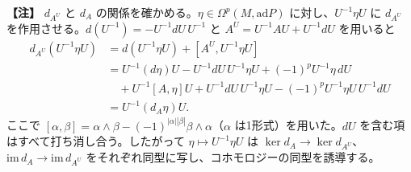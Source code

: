 \documentclass[uplatex, dvipdfmx, book]{jsbook}
\newenvironment{note}{\vspace{1ex}\par\footnotesize\noindent\textbf{【注】}}{\par\vspace{1ex}}
\begin{document}
\begin{note}
$d_{A^U}$ と $d_A$ の関係を確かめる。$\eta \in \Omega^p(M, \mathrm{ad}P)$ に対し、$U^{-1}\eta U$ に $d_{A^U}$ を作用させる。$d(U^{-1}) = -U^{-1}dU\,U^{-1}$ と $A^U = U^{-1}AU + U^{-1}dU$ を用いると
\begin{align*}
    d_{A^U}(U^{-1}\eta U)
    &= d(U^{-1}\eta U) + [A^U, U^{-1}\eta U] \\
    &= U^{-1}(d\eta)U - U^{-1}dU\,U^{-1}\eta U + (-1)^p U^{-1}\eta\, dU \\
    &\quad + U^{-1}[A, \eta]U + U^{-1}dU\, U^{-1}\eta U - (-1)^p U^{-1}\eta U\, U^{-1}dU \\
    &= U^{-1}(d_A\eta)U .
\end{align*}
ここで $[\alpha, \beta] = \alpha\wedge\beta - (-1)^{|\alpha||\beta|}\beta\wedge\alpha$（$\alpha$ は1形式）を用いた。$dU$ を含む項はすべて打ち消し合う。したがって $\eta \mapsto U^{-1}\eta U$ は $\ker d_A \to \ker d_{A^U}$、$\mathrm{im}\,d_A \to \mathrm{im}\,d_{A^U}$ をそれぞれ同型に写し、コホモロジーの同型を誘導する。
\end{note}
\end{document}
